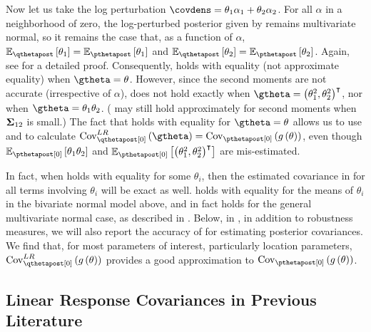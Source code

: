 \documentclass{article}\usepackage[]{graphicx}\usepackage[]{color}
\theoremstyle{definition}
\theoremstyle{plain}
\theoremstyle{plain}
\theoremstyle{plain}
\theoremstyle{definition}
\theoremstyle{plain}
\theoremstyle{plain}
\begin{document}
Now let us take the log perturbation
$\covdens=\theta_{1}\alpha_{1}+\theta_{2}\alpha_{2}$. For all $\alpha$ in a
neighborhood of zero, the log-perturbed posterior given by
 remains multivariate normal, so it remains the
case that, as a function of $\alpha$,
$\mbe_{\qthetapost}\left[\theta_{1}\right]=\mbe_{\pthetapost}\left[\theta_{1}\right]$
and
$\mbe_{\qthetapost}\left[\theta_{2}\right]=\mbe_{\pthetapost}\left[\theta_{2}\right]$.
Again, see  for a detailed proof. Consequently,
 holds with equality (not approximate equality) when
$\gtheta=\theta$. However, since the second moments are not accurate
(irrespective of $\alpha$),  does not hold exactly when
$\gtheta=\left(\theta_{1}^{2},\theta_{2}^{2}\right)^{\trans}$, nor when
$\gtheta=\theta_{1}\theta_{2}$. ( may still hold
approximately for second moments when $\boldsymbol{\Sigma}_{12}$ is small.) The fact that
 holds with equality for $\gtheta=\theta$ allows us
to use  and  to calculate
$\lrvbcov\left(\gtheta\right)=\pcov\left(g\left(\theta\right)\right)$, even
though $\mbe_{\pzeropost}\left[\theta_{1}\theta_{2}\right]$ and
$\mbe_{\pzeropost}\left[\left(\theta_{1}^{2},\theta_{2}^{2}\right)^{\trans}\right]$
are mis-estimated.

In fact, when  holds with equality for some
$\theta_{i}$, then the estimated covariance in
 for all terms involving $\theta_{i}$ will be
exact as well.  holds with equality for the means of
$\theta_{i}$ in the bivariate normal model above, and in fact holds for the
general multivariate normal case, as described in .
Below, in , in addition to robustness measures, we
will also report the accuracy of  for
estimating posterior covariances. We find that, for most parameters of interest,
particularly location parameters, $\lrvbcov\left(g\left(\theta\right)\right)$
provides a good approximation to $\pcov\left(g\left(\theta\right)\right)$.




\subsection{Linear Response Covariances in Previous Literature}
\end{document}
